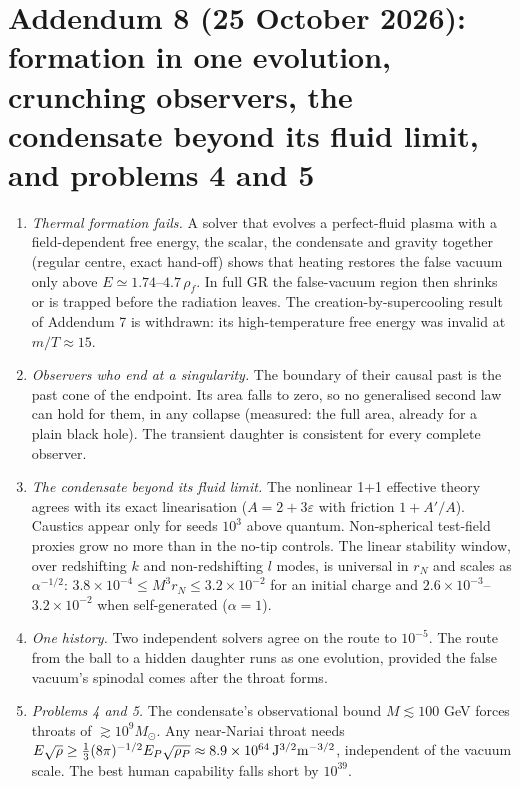 \documentclass[11pt,a4paper]{article}
\theoremstyle{remark}\newtheorem{remark}[theorem]{Remark}
\begin{document}
\section*{Addendum 8 (25 October 2026): formation in one evolution, crunching observers, the condensate beyond its fluid limit, and problems 4 and 5}
\begin{enumerate}
\item \emph{Thermal formation fails.} A solver that evolves a perfect-fluid plasma with a field-dependent free energy, the scalar, the condensate
and gravity together (regular centre, exact hand-off) shows that heating restores the false vacuum only above $E\simeq1.74$--$4.7\,\rho_f$. In full GR the
false-vacuum region then shrinks or is trapped before the radiation leaves. The creation-by-supercooling result of Addendum 7 is withdrawn: its
high-temperature free energy was invalid at $m/T\approx15$.
\item \emph{Observers who end at a singularity.} The boundary of their causal past is the past cone of the endpoint. Its area falls to zero, so no
generalised second law can hold for them, in any collapse (measured: the full area, already for a plain black hole). The transient daughter is
consistent for every complete observer.
\item \emph{The condensate beyond its fluid limit.} The nonlinear 1+1 effective theory agrees with its exact linearisation ($A=2+3\varepsilon$ with
friction $1+A'/A$). Caustics appear only for seeds $10^3$ above quantum. Non-spherical test-field proxies grow no more than in the no-tip controls. The
linear stability window, over redshifting $k$ and non-redshifting $l$ modes, is universal in $r_N$ and scales as $\alpha^{-1/2}$:
$3.8\times10^{-4}\le M^3r_N\le3.2\times10^{-2}$ for an initial charge and $2.6\times10^{-3}$--$3.2\times10^{-2}$ when self-generated ($\alpha=1$).
\item \emph{One history.} Two independent solvers agree on the route to $10^{-5}$. The route from the ball to a hidden daughter runs as one evolution,
provided the false vacuum's spinodal comes after the throat forms.
\item \emph{Problems 4 and 5.} The condensate's observational bound $M\lesssim100$ GeV forces throats of $\gtrsim10^9M_\odot$. Any near-Nariai
throat needs $E\sqrt\rho\ge\frac13(8\pi)^{-1/2}E_P\sqrt{\rho_P}\approx8.9\times10^{64}\,{\rm J^{3/2}m^{-3/2}}$, independent of the vacuum scale. The
best human capability falls short by $10^{39}$.
\end{enumerate}
\end{document}
